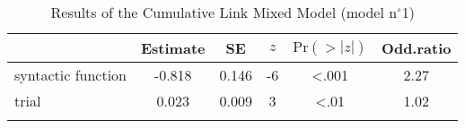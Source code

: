\begin{table}
\begin{tabular}{l S[table-format=-1.3] S[table-format=1.3] S[table-format=-1] S[table-format=<1.3] S[table-format=1.2]}
  \lsptoprule
 & {Estimate} & {SE} & {$z$} & {$\text{Pr}(>|z|)$} & {Odd.ratio} \\ 
  \midrule
  syntactic function & -0.818 & 0.146 & -6 & <.001 & 2.27 \\ 
  trial & 0.023 & 0.009 & 3 & <.01 & 1.02 \\ 
   \lspbottomrule
\end{tabular}
\caption{Results of the Cumulative Link Mixed Model (model n$^{\circ}$1)}
\label{tab:exp08-m1}
\end{table}
